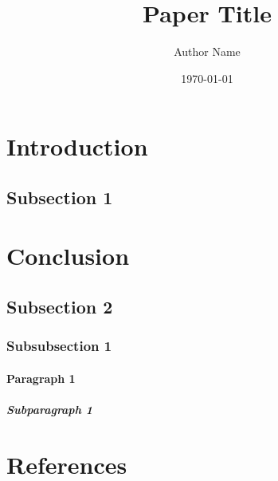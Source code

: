 \documentclass[titlepage]{article}
\begin{document}
\title{Paper Title}
\author{Author Name}
\date{\today}

\maketitle

\tableofcontents

\begin{abstract}
\lipsum[1]
\lipsum[]
\end{abstract}

\section{Introduction}
\lipsum[0]

\subsection{Subsection 1}
\lipsum[1]

\section{Conclusion}
\lipsum[10]

\subsection{Subsection 2}
\lipsum[13]

\subsubsection{Subsubsection 1}
\lipsum[16]

\paragraph{Paragraph 1}
\lipsum[20]

\subparagraph{Subparagraph 1}
\lipsum[22]

\section{References}
\lipsum[25]
\end{document}
